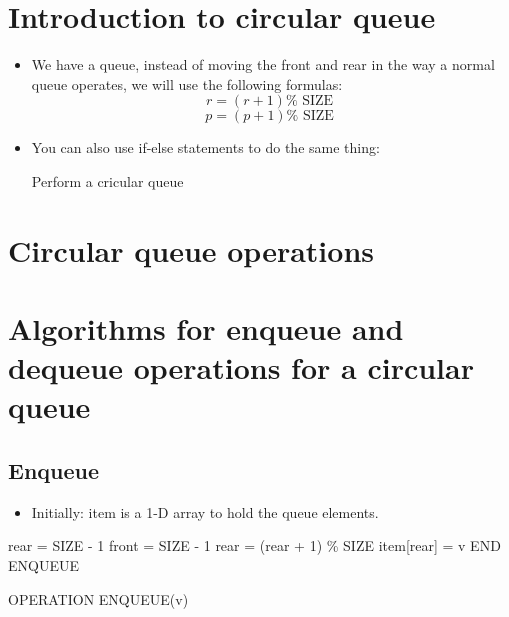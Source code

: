 \section{Introduction to circular queue}
\begin{itemize}
    \item We have a queue, instead of moving the front  and rear in the way a normal queue operates, we will use the following formulas:
        \[
          r = (r+1)\%\text{ SIZE }
        \]
        \[
          p = (p+1)\%\text{ SIZE }
        \]
    
    \item You can also use if-else statements to do the same thing:
        \begin{center}
            \begin{algorithm}[H]
                \SetAlgoLined
                \large
                \caption{Perform a cricular queue}
            \end{algorithm}
        \end{center}
\end{itemize}


\section{Circular queue operations}



\section{Algorithms for enqueue and dequeue operations for a circular queue}

\subsection{Enqueue}
\begin{center}
    \begin{itemize}
        \item Initially: item is a 1-D array to hold the queue elements.
    \end{itemize}
    \begin{algorithm}[H]
        \SetAlgoLined
        \large
        rear = SIZE - 1\; 
        front = SIZE - 1\;  
        rear = (rear + 1) \% SIZE\;
        item[rear] = v\;  
        END ENQUEUE\; 
        \caption{OPERATION ENQUEUE(v)}
    \end{algorithm}
\end{center}

